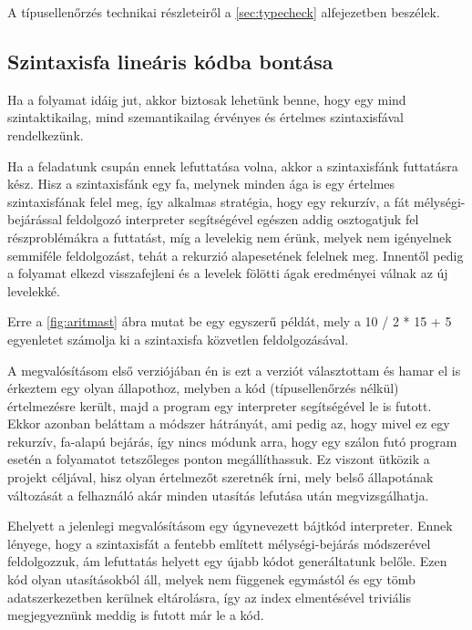 A típusellenőrzés technikai részleteiről a \ref{sec:typecheck} alfejezetben beszélek.

\subsection{Szintaxisfa lineáris kódba bontása}

Ha a folyamat idáig jut, akkor biztosak lehetünk benne, hogy egy mind szintaktikailag, mind szemantikailag érvényes és értelmes szintaxisfával rendelkezünk.

Ha a feladatunk csupán ennek lefuttatása volna, akkor a szintaxisfánk futtatásra kész. Hisz a szintaxisfánk egy fa, melynek minden ága is egy értelmes szintaxisfának felel meg, így alkalmas stratégia, hogy egy rekurzív, a fát mélységi-bejárással feldolgozó interpreter segítségével egészen addig osztogatjuk fel részproblémákra a futtatást, míg a levelekig nem érünk, melyek nem igényelnek semmiféle feldolgozást, tehát a rekurzió alapesetének felelnek meg. Innentől pedig a folyamat elkezd visszafejleni és a levelek fölötti ágak eredményei válnak az új levelekké.

Erre a \ref{fig:aritmast} ábra mutat be egy egyszerű példát, mely a 10 / 2 * 15 + 5 egyenletet számolja ki a szintaxisfa közvetlen feldolgozásával.


A megvalósításom első verziójában én is ezt a verziót választottam és hamar el is érkeztem egy olyan állapothoz, melyben a kód (típusellenőrzés nélkül) értelmezésre került, majd a program egy interpreter segítségével le is futott. Ekkor azonban beláttam a módszer hátrányát, ami pedig az, hogy mivel ez egy rekurzív, fa-alapú bejárás, így nincs módunk arra, hogy egy szálon futó program esetén a folyamatot tetszőleges ponton megállíthassuk. Ez viszont ütközik a projekt céljával, hisz olyan értelmezőt szeretnék írni, mely belső állapotának változását a felhaználó akár minden utasítás lefutása után megvizsgálhatja.

Ehelyett a jelenlegi megvalósításom egy úgynevezett bájtkód interpreter. Ennek lényege, hogy a szintaxisfát a fentebb említett mélységi-bejárás módszerével feldolgozzuk, ám lefuttatás helyett egy újabb kódot generáltatunk belőle. Ezen kód olyan utasításokból áll, melyek nem függenek egymástól és egy tömb adatszerkezetben kerülnek eltárolásra, így az index elmentésével triviális megjegyeznünk meddig is futott már le a kód.

